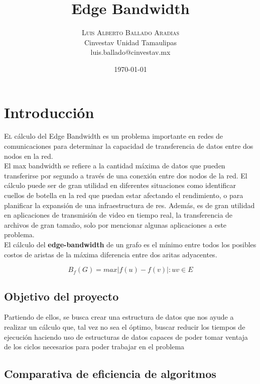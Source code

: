 \documentclass[oneside,onecolumn]{article}
\title{Edge Bandwidth} %
\author{%
\textsc{Luis Alberto Ballado Aradias} \\%
\normalsize Cinvestav Unidad Tamaulipas \\ %
\normalsize luis.ballado@cinvestav.mx %
}
\date{\today} %
\begin{document}
\maketitle

\section{Introducción}

\lettrine[nindent=0em,lines=3]{E}l cálculo del Edge Bandwidth es un problema importante en redes de comunicaciones para determinar la capacidad de transferencia de datos entre dos nodos en la red.\\

El max bandwidth se refiere a la cantidad máxima de datos que pueden transferirse por segundo a través de una conexión entre dos nodos de la red. El cálculo puede ser de gran utilidad en diferentes situaciones como identificar cuellos de botella en la red que puedan estar afectando el rendimiento, o para planificar la expansión de una infraestructura de res. Además, es de gran utilidad en aplicaciones de transmisión de video en tiempo real, la transferencia de archivos de gran tamaño, solo por mencionar algunas aplicaciones a este problema.\\

El cálculo del \textbf{edge-bandwidth} de un grafo es el mínimo entre todos los posibles costos de aristas de la máxima diferencia entre dos aritas adyacentes. 

\begin{center}
  \[B_f(G) = max{|f(u)-f(v)|: uv \in E}\]
\end{center}

\subsection{Objetivo del proyecto}

Partiendo de ellos, se busca crear una estructura de datos que nos ayude a realizar un cálculo que, tal vez no sea el óptimo, buscar reducir los tiempos de ejecución haciendo uso de estructuras de datos capaces de poder tomar ventaja de los ciclos necesarios para poder trabajar en el problema

\subsection{Comparativa de eficiencia de algoritmos}
\end{document}
